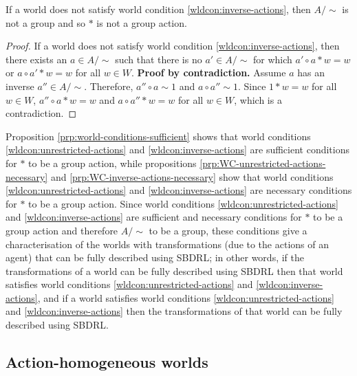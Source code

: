 \begin{proposition}\label{prp:WC-inverse-actions-necessary}
    If a world does not satisfy world condition \ref{wldcon:inverse-actions}, then $A/\sim$ is not a group and so $*$ is not a group action.
\end{proposition}
\begin{proof}
    If a world does not satisfy world condition \ref{wldcon:inverse-actions}, then there exists an $a \in A/\sim$ such that there is no $a' \in A/\sim$ for which $a' \circ a * w = w$ or $a \circ a' * w = w$ for all $w \in W$.
    \textbf{Proof by contradiction.}
    Assume $a$ has an inverse $a'' \in A/\sim$.
    Therefore, $a'' \circ a \sim 1$ and $a \circ a'' \sim 1$.
    Since $1 * w = w$ for all $w \in W$, $a'' \circ a * w = w$ and $a \circ a'' * w = w$ for all $w \in W$, which is a contradiction.
\end{proof}


Proposition \ref{prp:world-conditions-sufficient} shows that world conditions \ref{wldcon:unrestricted-actions} and \ref{wldcon:inverse-actions} are sufficient conditions for $*$ to be a group action, while propositions \ref{prp:WC-unrestricted-actions-necessary} and \ref{prp:WC-inverse-actions-necessary} show that world conditions \ref{wldcon:unrestricted-actions} and \ref{wldcon:inverse-actions} are necessary conditions for $*$ to be a group action.
Since world conditions \ref{wldcon:unrestricted-actions} and \ref{wldcon:inverse-actions} are sufficient and necessary conditions for $*$ to be a group action and therefore $A/\sim$ to be a group, these conditions give a characterisation of the worlds with transformations (due to the actions of an agent) that can be fully described using SBDRL; in other words, if the transformations of a world can be fully described using SBDRL then that world satisfies world conditions \ref{wldcon:unrestricted-actions} and \ref{wldcon:inverse-actions}, and if a world satisfies world conditions \ref{wldcon:unrestricted-actions} and \ref{wldcon:inverse-actions} then the transformations of that world can be fully described using SBDRL.

\subsection{Action-homogeneous worlds}


